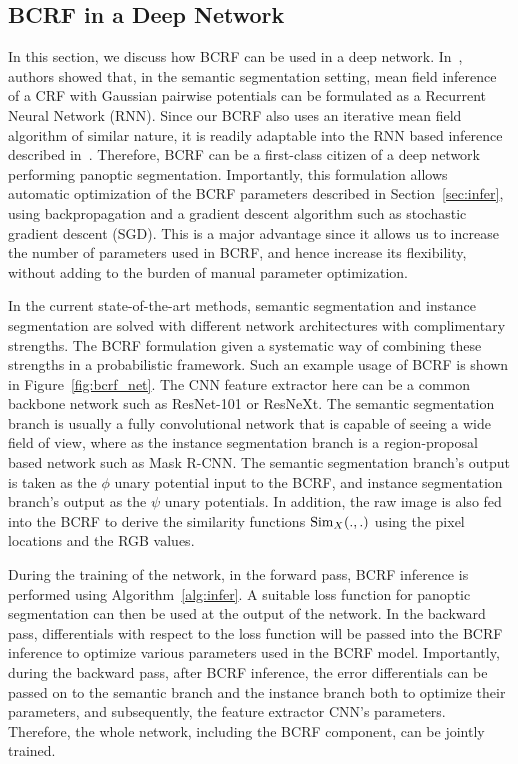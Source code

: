 \subsection{BCRF in a Deep Network}
In this section, we discuss how BCRF can be used in a deep network. In~\cite{Zhen_ICCV15_CRFRNN}, authors showed that, in the semantic segmentation setting, mean field inference of a CRF with Gaussian pairwise potentials can be formulated as a Recurrent Neural Network (RNN). Since our BCRF also uses an iterative mean field algorithm of similar nature, it is readily adaptable into the RNN based inference described in~\cite{Zhen_ICCV15_CRFRNN}. Therefore, BCRF can be a first-class citizen of a deep network performing panoptic segmentation. Importantly, this formulation allows automatic optimization of the BCRF parameters described in Section~\ref{sec:infer}, using backpropagation and a gradient descent algorithm such as stochastic gradient descent (SGD). This is a major advantage since it allows us to increase the number of parameters used in BCRF, and hence increase its flexibility, without adding to the burden of manual parameter optimization.

In the current state-of-the-art methods, semantic segmentation and instance segmentation are solved with different network architectures with complimentary strengths. The BCRF formulation given a systematic way of combining these strengths in a probabilistic framework. Such an example usage of BCRF is shown in Figure~\ref{fig:bcrf_net}. The CNN feature extractor here can be a common backbone network such as ResNet-101 or ResNeXt. The semantic segmentation branch is usually a fully convolutional network that is capable of seeing a wide field of view, where as the instance segmentation branch is a region-proposal based network such as Mask R-CNN. The semantic segmentation branch's output is taken as the $\phi$ unary potential input to the BCRF, and instance segmentation branch's output as the $\psi$ unary potentials. In addition, the raw image is also fed into the BCRF to derive the similarity functions $\operatorname{Sim}_X(., .)$ using the pixel locations and the RGB values. 

During the training of the network, in the forward pass, BCRF inference is performed using Algorithm~\ref{alg:infer}. A suitable loss function for panoptic segmentation can then be used at the output of the network. In the backward pass, differentials with respect to the loss function will be passed into the BCRF inference to optimize various parameters used in the BCRF model. Importantly, during the backward pass, after BCRF inference, the error differentials can be passed on to the semantic branch and the instance branch both to optimize their parameters, and subsequently, the feature extractor CNN's parameters. Therefore, the whole network, including the BCRF component, can be jointly trained.


